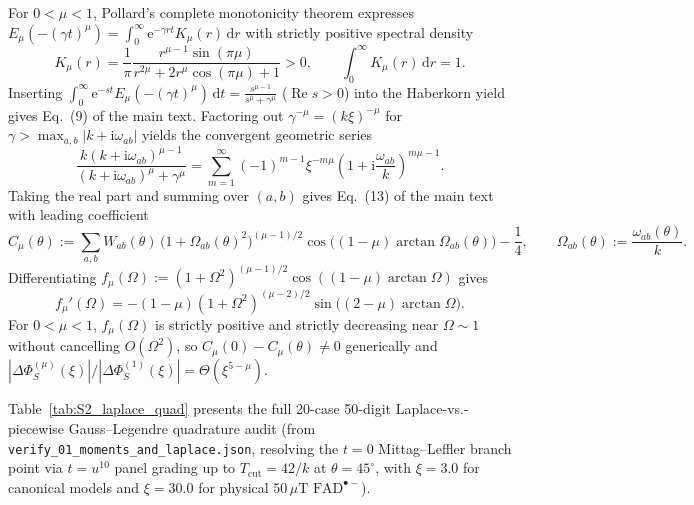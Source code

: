 \documentclass[onecolumn,10pt,notitlepage,amsmath,amssymb,floatfix]{revtex4-2}
\theoremstyle{plain}
\theoremstyle{definition}
\newcommand{\dd}{\mathrm{d}}
\newcommand{\ii}{\mathrm{i}}
\newcommand{\ee}{\mathrm{e}}
\newcommand{\DeltaPhi}{\Delta\Phi_S}
\begin{document}
For $0 < \mu < 1$, Pollard's complete monotonicity theorem expresses $E_\mu(-(\gamma t)^\mu) = \int_0^\infty \ee^{-\gamma r t} K_\mu(r)\,\dd r$ with strictly positive spectral density
\begin{equation}
\label{eq:S2_pollard}
K_\mu(r) = \frac{1}{\pi}\frac{r^{\mu-1}\sin(\pi\mu)}{r^{2\mu} + 2r^\mu\cos(\pi\mu) + 1} > 0, \qquad
\int_0^\infty K_\mu(r)\,\dd r = 1.
\end{equation}
Inserting $\int_0^\infty \ee^{-st} E_\mu(-(\gamma t)^\mu)\,\dd t = \frac{s^{\mu-1}}{s^\mu + \gamma^\mu}$ ($\operatorname{Re} s > 0$) into the Haberkorn yield gives Eq.~(9) of the main text. Factoring out $\gamma^{-\mu} = (k\xi)^{-\mu}$ for $\gamma > \max_{a,b} |k+\ii\omega_{ab}|$ yields the convergent geometric series
\begin{equation}
\label{eq:S2_ML_series}
\frac{k(k+\ii\omega_{ab})^{\mu-1}}{(k+\ii\omega_{ab})^\mu + \gamma^\mu}
= \sum_{m=1}^\infty (-1)^{m-1} \xi^{-m\mu}\left(1 + \ii\frac{\omega_{ab}}{k}\right)^{m\mu - 1}.
\end{equation}
Taking the real part and summing over $(a,b)$ gives Eq.~(13) of the main text with leading coefficient
\begin{equation}
\label{eq:S2_ML_coeff}
C_\mu(\theta) := \sum_{a,b} W_{ab}(\theta)\,\big(1 + \Omega_{ab}(\theta)^2\big)^{(\mu-1)/2}\cos\!\Big((1-\mu)\arctan \Omega_{ab}(\theta)\Big) - \frac{1}{4}, \qquad \Omega_{ab}(\theta) := \frac{\omega_{ab}(\theta)}{k}.
\end{equation}
Differentiating $f_\mu(\Omega) := (1+\Omega^2)^{(\mu-1)/2}\cos((1-\mu)\arctan\Omega)$ gives
\[
f_\mu'(\Omega) = -(1-\mu)(1+\Omega^2)^{(\mu-2)/2}\sin\!\big((2-\mu)\arctan\Omega\big).
\]
For $0 < \mu < 1$, $f_\mu(\Omega)$ is strictly positive and strictly decreasing near $\Omega \sim 1$ without cancelling $O(\Omega^2)$, so $C_\mu(0) - C_\mu(\theta) \neq 0$ generically and $|\DeltaPhi^{(\mu)}(\xi)| / |\DeltaPhi^{(1)}(\xi)| = \Theta(\xi^{5-\mu})$.

Table~\ref{tab:S2_laplace_quad} presents the full 20-case 50-digit Laplace-vs.-piecewise Gauss--Legendre quadrature audit (from \texttt{verify\_01\_moments\_and\_laplace.json}, resolving the $t=0$ Mittag--Leffler branch point via $t=u^{10}$ panel grading up to $T_{\mathrm{cut}} = 42/k$ at $\theta = 45^\circ$, with $\xi = 3.0$ for canonical models and $\xi = 30.0$ for physical $50\,\mu\text{T}$ $\mathrm{FAD}^{\bullet-}$).
\end{document}
